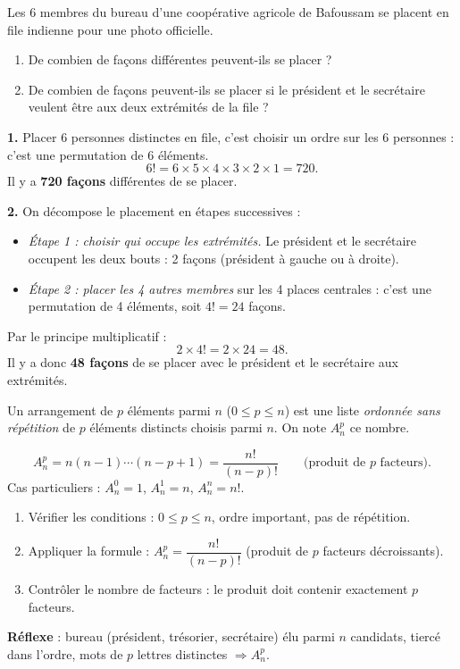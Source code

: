 \documentclass[11pt]{article}
\newcommand{\cle}[1]{{\popxbold\color{popdark}#1}}
\begin{document}
\begin{exoresolu}
Les 6 membres du bureau d'une coopérative agricole de Bafoussam se placent en file indienne pour une photo officielle.
\begin{enumerate}
\item De combien de façons différentes peuvent-ils se placer ?
\item De combien de façons peuvent-ils se placer si le président et le secrétaire veulent être aux deux extrémités de la file ?
\end{enumerate}
\tcblower
\textbf{1.} Placer 6 personnes distinctes en file, c'est choisir un ordre sur les 6 personnes : c'est une permutation de 6 éléments.
\[ 6!=6\times 5\times 4\times 3\times 2\times 1=720. \]
Il y a \textbf{720 façons} différentes de se placer.

\textbf{2.} On décompose le placement en étapes successives :
\begin{itemize}
\item \emph{Étape 1 : choisir qui occupe les extrémités.} Le président et le secrétaire occupent les deux bouts : 2 façons (président à gauche ou à droite).
\item \emph{Étape 2 : placer les 4 autres membres} sur les 4 places centrales : c'est une permutation de 4 éléments, soit $4!=24$ façons.
\end{itemize}
Par le principe multiplicatif :
\[ 2\times 4!=2\times 24=48. \]
Il y a donc \textbf{48 façons} de se placer avec le président et le secrétaire aux extrémités.
\end{exoresolu}

\begin{definition}[Arrangement]
Un \cle{arrangement} de $p$ éléments parmi $n$ ($0\le p\le n$) est une liste \emph{ordonnée sans répétition} de $p$ éléments distincts choisis parmi $n$. On note $A_n^p$ ce nombre.
\end{definition}

\begin{propriete}
\[ A_n^p=n(n-1)\cdots(n-p+1)=\frac{n!}{(n-p)!} \qquad\text{(produit de $p$ facteurs).} \]
Cas particuliers : $A_n^0=1$, $A_n^1=n$, $A_n^n=n!$.
\end{propriete}

\begin{methode}[Calculer $A_n^p$]
\begin{enumerate}
\item \cle{Vérifier les conditions} : $0\le p\le n$, ordre important, pas de répétition.
\item \cle{Appliquer la formule} : $A_n^p=\dfrac{n!}{(n-p)!}$ (produit de $p$ facteurs décroissants).
\item \cle{Contrôler le nombre de facteurs} : le produit doit contenir exactement $p$ facteurs.
\end{enumerate}
\textbf{Réflexe} : bureau (président, trésorier, secrétaire) élu parmi $n$ candidats, tiercé dans l'ordre, mots de $p$ lettres distinctes $\Rightarrow A_n^p$.
\end{methode}
\end{document}
